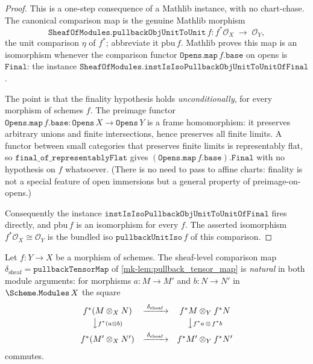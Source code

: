 \begin{proof}
  \leanok
  This is a one-step consequence of a Mathlib instance, with no chart-chase. The
  canonical comparison map is the genuine Mathlib morphism
  \[
    \mathtt{SheafOfModules.pullbackObjUnitToUnit}\,f :
      f^*\mathcal{O}_X \;\longrightarrow\; \mathcal{O}_Y,
  \]
  the unit comparison \(\eta\) of \(f^*\); abbreviate it \(\mathrm{pbu}\,f\). Mathlib
  proves this map is an isomorphism whenever the comparison functor
  \(\mathtt{Opens.map}\,f.\mathtt{base}\) on opens is \(\mathtt{Final}\): the instance
  \(\mathtt{SheafOfModules.instIsIsoPullbackObjUnitToUnitOfFinal}\).

  The point is that the finality hypothesis holds \emph{unconditionally}, for every
  morphism of schemes \(f\). The preimage functor \(\mathtt{Opens.map}\,f.\mathtt{base}
  : \mathtt{Opens}\,X \to \mathtt{Opens}\,Y\) is a frame homomorphism: it preserves
  arbitrary unions and finite intersections, hence preserves all finite limits. A
  functor between small categories that preserves finite limits is representably flat,
  so \(\mathtt{final\_of\_representablyFlat}\) gives \((\mathtt{Opens.map}\,f.\mathtt{base}).\mathtt{Final}\)
  with no hypothesis on \(f\) whatsoever. (There is no need to pass to affine charts:
  finality is not a special feature of open immersions but a general property of
  preimage-on-opens.)

  Consequently the instance \(\mathtt{instIsIsoPullbackObjUnitToUnitOfFinal}\) fires
  directly, and \(\mathrm{pbu}\,f\) is an isomorphism for every \(f\). The asserted
  isomorphism \(f^*\mathcal{O}_X \cong \mathcal{O}_Y\) is the bundled iso
  \(\mathtt{pullbackUnitIso}\,f\) of this comparison.
\end{proof}

\begin{lemma}\label{mk-lem:pullback_tensor_map_natural}
  \leanok

  Let \(f : Y \to X\) be a morphism of schemes. The sheaf-level comparison map
  \(\delta_{\mathrm{sheaf}} = \mathtt{pullbackTensorMap}\) of
  \ref{mk-lem:pullback_tensor_map} is \emph{natural} in both module arguments: for
  morphisms \(a : M \to M'\) and \(b : N \to N'\) in \(\Scheme.\mathtt{Modules}\,X\)
  the square
  \[
    \begin{array}{ccc}
      f^*(M \otimes_X N)
        & \xrightarrow{\;\delta_{\mathrm{sheaf}}\;}
        & f^*M \otimes_Y f^*N \\[2pt]
      \big\downarrow{\scriptstyle f^*(a \otimes b)}
        & & \big\downarrow{\scriptstyle f^*a \,\otimes\, f^*b} \\[4pt]
      f^*(M' \otimes_X N')
        & \xrightarrow{\;\delta_{\mathrm{sheaf}}\;}
        & f^*M' \otimes_Y f^*N'
    \end{array}
  \]
  commutes.
\end{lemma}

